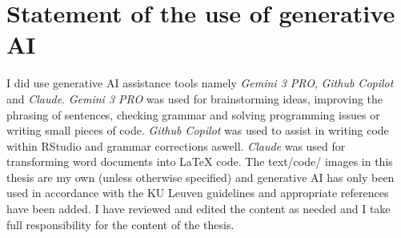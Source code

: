 \chapter*{Statement of the use of generative AI}

I did use generative AI assistance tools namely \textit{Gemini 3 PRO}, \textit{Github Copilot} and \textit{Claude}.
\textit{Gemini 3 PRO} was used for brainstorming ideas, improving the phrasing of sentences, checking grammar and solving programming issues or writing small pieces of code.
\textit{Github Copilot} was used to assist in writing code within RStudio and grammar corrections aswell. 
\textit{Claude} was used for transforming word documents into LaTeX code. 
The text/code/ images in this thesis are my own (unless otherwise specified) and generative AI has only been used in accordance with the KU Leuven guidelines and appropriate references have been added. 
I have reviewed and edited the content as needed and I take full responsibility for the content of the thesis. 
